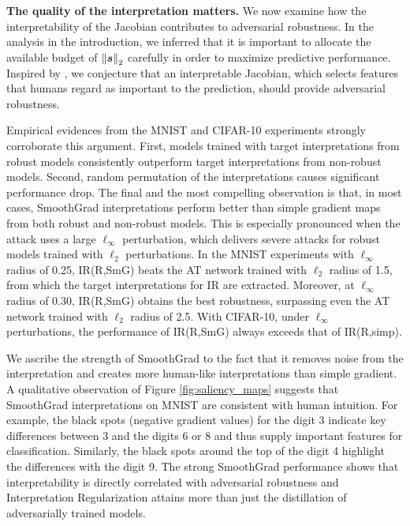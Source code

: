 \textbf{The quality of the interpretation matters.} \label{subsubsec:interp_quality}
We now examine how the interpretability of the Jacobian contributes to adversarial robustness. In the analysis in the introduction, we inferred that it is important to allocate the available budget of $\left\lVert\bm s\right\rVert_2$ carefully in order to maximize predictive performance. Inspired by \cite{ilyas2019adversarial}, we conjecture that an interpretable Jacobian, which selects features that humans regard as important to the prediction, should provide adversarial robustness. 

Empirical evidences from the MNIST and CIFAR-10 experiments strongly corroborate this argument. First, models trained with target interpretations from robust models consistently outperform target interpretations from non-robust models. Second, random permutation of the interpretations causes significant performance drop. The final and the most compelling observation is that, in most cases, SmoothGrad interpretations perform better than simple gradient maps from both robust and non-robust models. This is especially pronounced when the attack uses a large $\ell_\infty$ perturbation, which delivers severe attacks for robust models trained with $\ell_2$ perturbations. In the MNIST experiments with $\ell_\infty$ radius of 0.25, IR(R,SmG) beats the AT network trained with $\ell_2$ radius of 1.5, from which the target interpretations for IR are extracted. Moreover, at $\ell_\infty$ radius of 0.30, IR(R,SmG) obtains the best robustness, surpassing even the AT network trained with $\ell_2$ radius of 2.5.  
With CIFAR-10, under $\ell_\infty$ perturbations, the performance of IR(R,SmG) always exceeds that of IR(R,simp). 

We ascribe the strength of SmoothGrad to the fact that it removes noise from the interpretation and creates more human-like interpretations than simple gradient. A qualitative observation of Figure \ref{fig:saliency_maps} suggests that SmoothGrad interpretations on MNIST are consistent with human intuition. For example, the black spots (negative gradient values) for the digit 3 indicate key differences between 3 and the digits 6 or 8 and thus supply important features for classification. Similarly, the black spots around the top of the digit 4 highlight the differences with the digit 9. 
The strong SmoothGrad performance shows that interpretability is directly correlated with adversarial robustness and Interpretation Regularization attains more than just the distillation of adversarially trained models.





